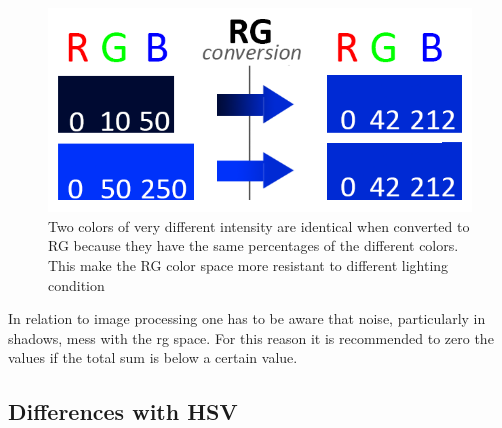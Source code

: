 \begin{figure}[H]
	\centering
	\includegraphics[width=0.6\linewidth]{figure/Analysis/rgconversion.png}
	\caption{Two colors of very different intensity are identical when converted to RG because they have the same percentages of the different colors. This make the RG color space more resistant to different lighting condition}
	\label{fig:conversion}
\end{figure} 
In relation to image processing one has to be aware that noise, particularly in shadows, mess with the rg space. For this reason it is recommended to zero the values if the total sum is below a certain value.

\subsection{Differences with HSV}
